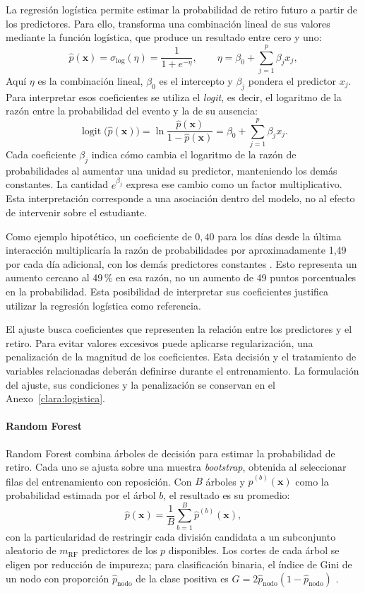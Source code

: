 La regresión logística permite estimar la probabilidad de retiro futuro a partir de los predictores. Para ello, transforma una combinación lineal de sus valores mediante la función logística, que produce un resultado entre cero y uno:
\[
\hat{p}(\mathbf{x})=\sigma_{\mathrm{log}}(\eta)=\frac{1}{1+e^{-\eta}},
\qquad
\eta=\beta_{0}+\sum_{j=1}^{p}\beta_{j}x_{j},
\]
Aquí $\eta$ es la combinación lineal, $\beta_0$ es el intercepto y $\beta_j$ pondera el predictor $x_j$. Para interpretar esos coeficientes se utiliza el \textit{logit}, es decir, el logaritmo de la razón entre la probabilidad del evento y la de su ausencia:
\begin{equation}\label{eq:logit}
\operatorname{logit}\big(\hat{p}(\mathbf{x})\big)
=\ln\frac{\hat{p}(\mathbf{x})}{1-\hat{p}(\mathbf{x})}
=\beta_{0}+\sum_{j=1}^{p}\beta_{j}x_{j}.
\end{equation}
Cada coeficiente $\beta_j$ indica cómo cambia el logaritmo de la razón de probabilidades al aumentar una unidad su predictor, manteniendo los demás constantes. La cantidad $e^{\beta_j}$ expresa ese cambio como un factor multiplicativo. Esta interpretación corresponde a una asociación dentro del modelo, no al efecto de intervenir sobre el estudiante.

Como ejemplo hipotético, un coeficiente de $0{,}40$ para los días desde la última interacción multiplicaría la razón de probabilidades por aproximadamente 1,49 por cada día adicional, con los demás predictores constantes \cite{hosmer2013}. Esto representa un aumento cercano al 49\,\% en esa razón, no un aumento de 49 puntos porcentuales en la probabilidad. Esta posibilidad de interpretar sus coeficientes justifica utilizar la regresión logística como referencia.

El ajuste busca coeficientes que representen la relación entre los predictores y el retiro. Para evitar valores excesivos puede aplicarse regularización, una penalización de la magnitud de los coeficientes. Esta decisión y el tratamiento de variables relacionadas deberán definirse durante el entrenamiento. La formulación del ajuste, sus condiciones y la penalización se conservan en el Anexo~\ref{clara:logistica}.

\paragraph{Random Forest}

Random Forest combina árboles de decisión para estimar la probabilidad de retiro. Cada uno se ajusta sobre una muestra \textit{bootstrap}, obtenida al seleccionar filas del entrenamiento con reposición. Con $B$ árboles y $\hat p^{(b)}(\mathbf x)$ como la probabilidad estimada por el árbol $b$, el resultado es su promedio:
\[
\hat{p}(\mathbf{x})=\frac{1}{B}\sum_{b=1}^{B}\hat{p}^{(b)}(\mathbf{x}),
\]
con la particularidad de restringir cada división candidata a un subconjunto aleatorio de $m_{\mathrm{RF}}$ predictores de los $p$ disponibles. Los cortes de cada árbol se eligen por reducción de impureza; para clasificación binaria, el índice de Gini de un nodo con proporción $\hat p_{\mathrm{nodo}}$ de la clase positiva es $G=2\hat p_{\mathrm{nodo}}(1-\hat p_{\mathrm{nodo}})$ \cite{breiman2001,james2023}.


